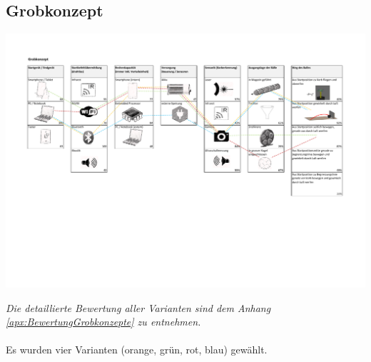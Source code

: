 \begin{landscape}
	\section{Grobkonzept}	
		\includegraphics[page=1,scale=0.825,clip,trim=17mm 75mm 18mm 26mm]{Morphologie/Bilder/Grobkonzept.pdf}
\end{landscape} 
\textit{Die detaillierte Bewertung aller Varianten sind dem Anhang \ref{apx:BewertungGrobkonzepte} zu entnehmen.}\\
\\
Es wurden vier Varianten (orange, grün, rot, blau) gewählt. 

